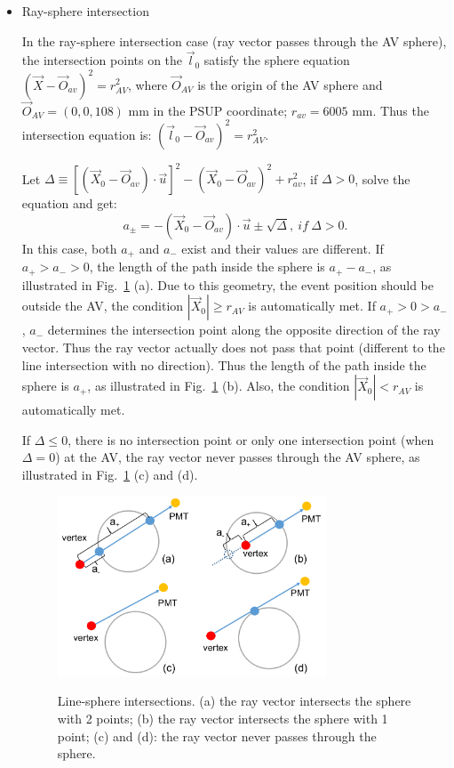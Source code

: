 \begin{itemize}
\item Ray-sphere intersection

In the ray-sphere intersection case (ray vector passes through the AV sphere), the intersection points on the $\vec{l}_0$ satisfy the sphere equation $(\vec{X}-\vec{O}_{av})^2= r^2_{AV}$, where $\vec{O}_{AV}$ is the origin of the AV sphere and $\vec{O}_{AV} = (0,0,108)$ mm in the PSUP coordinate; $r_{av}=6005$ mm. Thus the intersection equation is:
$(\vec{l}_0-\vec{O}_{av})^2 = r^2_{AV}$.

Let $\Delta \equiv {[(\vec{X}_0-\vec{O}_{av})\cdot\vec{u}]}^2-{(\vec{X}_0-\vec{O}_{av})}^2+r^2_{av}$, if $\Delta>0$, solve the equation and get:
\begin{equation}\label{eq:ray-sphere}
a_{\pm} = -(\vec{X}_0-\vec{O}_{av})\cdot\vec{u}\pm\sqrt{\Delta},~if~\Delta>0.
\end{equation}
In this case, both $a_+$ and $a_-$ exist and their values are different. If $a_+>a_->0$, the length of the path inside the sphere is $a_+-a_-$, as illustrated in Fig.~\ref{line-sphere} (a). Due to this geometry, the event position should be outside the AV, the condition $|\vec{X}_0|\geq r_{AV}$ is automatically met. If $a_+>0>a_-$, $a_-$ determines the intersection point along the opposite direction of the ray vector. Thus the ray vector actually does not pass that point (different to the line intersection with no direction). Thus the length of the path inside the sphere is $a_+$, as illustrated in Fig.~\ref{line-sphere} (b). Also, the condition $|\vec{X}_0|<r_{AV}$ is automatically met. 

If $\Delta\leq0$,
there is no intersection point or only one intersection point (when $\Delta=0$) at the AV, the ray vector never passes through the AV sphere, as illustrated in Fig.~\ref{line-sphere} (c) and (d).

\begin{figure}
	\centering
{\includegraphics[width=80mm]{line-sphere.png}}
\caption[Line-sphere intersections.]{Line-sphere intersections. (a) the ray vector intersects the sphere with 2 points; (b) the ray vector intersects the sphere with 1 point; (c) and (d): the ray vector never passes through the sphere.}\label{line-sphere}
\end{figure}


\end{itemize}
